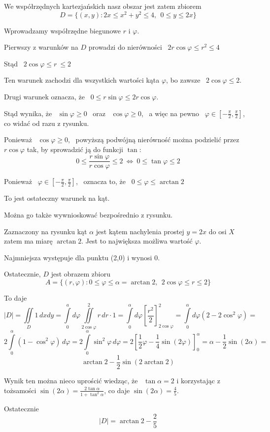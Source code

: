 \begin{przykladbig}
    We współrzędnych kartezjańskich nasz obszar jest zatem zbiorem
    \[ D = \{ (x,y): 2x \leq x^2 + y^2 \leq 4, \ \ 0 \leq y \leq 2x \} \]

    Wprowadzamy współrzędne biegunowe $r$ i $\varphi$.
    
    Pierwszy z warunków na $D$ prowadzi do nierówności \ $ 2r \cos \varphi \leq r^2 \leq 4 $

    Stąd \ $ 2 \cos \varphi \leq r \ \leq 2 $

    Ten warunek zachodzi dla wszystkich wartości kąta $\varphi$, bo zawsze \ $ 2\cos \varphi \leq 2 $.

    Drugi warunek oznacza, że \ $ 0 \leq r \sin \varphi \leq 2r \cos \varphi $.

    Stąd wynika, że \ $ \sin \varphi \geq 0 $ \ oraz \ $ \cos \varphi \geq 0 $, \ a więc na pewno \ $ \varphi \in \left[ -\frac{\pi}{2}, \frac{\pi}{2} \right] $,
    co widać od razu z rysunku.

    Ponieważ \ $ \cos \varphi \geq 0 $, \ powyższą podwójną nierówność można podzielić przez \ $ r \cos \varphi $ tak, by sprowadzić ją do funkcji $\tan$:
    \[ 0 \leq \frac{r \sin \varphi}{r \cos \varphi} \leq 2 \ \Leftrightarrow \ 0 \leq \tan \varphi \leq 2 \]

    Ponieważ \ $ \varphi \in \left[ -\frac{\pi}{2}, \frac{\pi}{2} \right] $, \ oznacza to, że \ $ 0 \leq \varphi \leq \arctan 2 $

    To jest ostateczny warunek na kąt.

    Można go także wywnioskować bezpośrednio z rysunku.

    Zaznaczony na rysunku kąt $\alpha$ jest kątem nachylenia prostej $y = 2x$ do osi $X$ zatem ma miarę $\arctan 2$.
    Jest to największa możliwa wartość $\varphi$.

    Najmniejsza występuje dla punktu (2,0) i wynosi 0.

    Ostatecznie, $D$ jest obrazem zbioru
    \[ A = \{ (r, \varphi): 0 \leq \varphi \leq \alpha = \arctan 2, \ \ 2 \cos \varphi \leq r \leq 2 \} \]

    To daje
    \[ |D| = \iint\limits_D 1\, dxdy = \int\limits_{0}^{a} d \varphi \iint\limits_{2 \cos \varphi}^{2} r\, dr \cdot 1 =
    \int\limits_{0}^{\alpha} d\varphi \left[ \frac{r^2}{2} \right]_{2 \cos \varphi}^{2} = \int\limits_{0}^{\alpha} d\varphi (2 - 2\cos^2 \varphi) = \]
    \[ 2 \int\limits_{0}^{\alpha} (1 - \cos^2 \varphi) \, d\varphi = 2 \int\limits_{0}^{\alpha} \sin^2 \varphi \, d \varphi =
    2 \left[ \frac{1}{2} \varphi - \frac{1}{4} \sin (2\varphi) \right]_{0}^{\alpha} = \alpha  - \frac{1}{2} \sin (2\alpha) = \]
    \[ \arctan 2 - \frac{1}{2} \sin(2 \arctan 2) \]
    
    Wynik ten można nieco uprościć wiedząc, że \ $\tan \alpha = 2$ i korzystając z tożsamości $ \sin (2\alpha) = \frac{2 \tan \alpha}{1 + \tan^2 \alpha} $,
    co daje $ \sin (2\alpha) = \frac{4}{5} $. \medskip

    Ostatecznie
    \[ |D| = \arctan 2 - \frac{2}{5} \]
\end{przykladbig}

